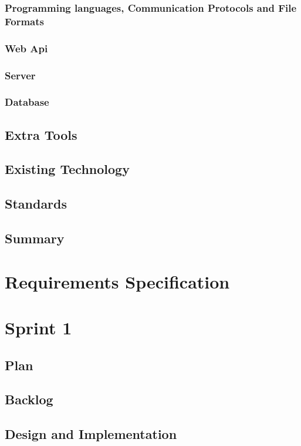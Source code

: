 \documentclass[12pt, a4paper]{article}
\begin{document}
\subsubsection{Programming languages, Communication Protocols and File Formats}
\subsubsection{Web Api}
\subsubsection{Server}
\subsubsection{Database}
\subsection{Extra Tools}
\subsection{Existing Technology}
\subsection{Standards}
\subsection{Summary}

\section{Requirements Specification}



\section{Sprint 1}
\subsection{Plan}
\subsection{Backlog}
\subsection{Design and Implementation}
\end{document}
